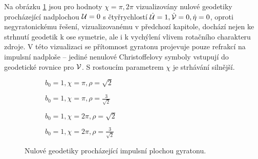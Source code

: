 Na obrázku \ref{fig:gyra_flat_null_b1_chi1_2} jsou pro hodnoty $\chi = \pi, 2\pi$ vizualizovány nulové geodetiky procházející nadplochou $\mathcal{U} = 0$ s
čtyřrychlostí $\dot{\mathcal{U}} = 1, \dot{\mathcal{V}} = 0, \dot{\eta} = 0$, oproti negyratonickému řešení, vizualizovanému v předchozí kapitole, dochází
nejen ke strhnutí geodetik k ose symetrie, ale i k vychýlení vlivem rotačního charakteru zdroje. V této vizualizaci se
přítomnost gyratonu projevuje pouze refrakcí na impulsní nadploše -- jediné nenulové Christoffelovy symboly vstupují do geodetické rovnice pro $\mathcal{V}$.
S rostoucím parametrem $\chi$ je strhávání silnější.
\begin{figure}[H]
    \centering
    \begin{subfigure}[b]{0.48\textwidth}
         \caption{$b_0=1, \chi=\pi, \rho=\sqrt{2}$} 
    \end{subfigure}
    \begin{subfigure}[b]{0.48\textwidth}
         \caption{$b_0=1, \chi=\pi, \rho=\frac{3}{\sqrt{2}}$} 
    \end{subfigure}
    \hfill
    \begin{subfigure}[b]{0.48\textwidth}
         \caption{$b_0=1, \chi=2\pi, \rho=\sqrt{2}$} 
    \end{subfigure}
    \begin{subfigure}[b]{0.48\textwidth}
         \caption{$b_0=1, \chi=2\pi, \rho=\frac{3}{\sqrt{2}}$} 
    \end{subfigure}
    \caption{Nulové geodetiky procházející impulsní plochou gyratonu.}
    \label{fig:gyra_flat_null_b1_chi1_2}
\end{figure}

